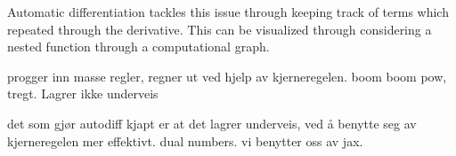 Automatic differentiation tackles this issue through keeping track of terms which repeated through the derivative.
This can be visualized through considering a nested function through a computational graph.

progger inn masse regler, regner ut ved hjelp av kjerneregelen. boom boom pow, tregt. Lagrer ikke underveis

det som gjør autodiff kjapt er at det lagrer underveis, ved å benytte seg av kjerneregelen mer effektivt. dual numbers. vi benytter oss av jax. 



